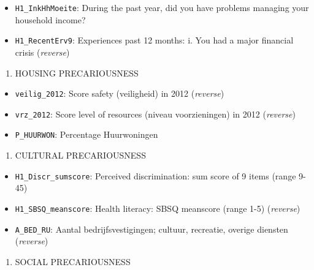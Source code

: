 \documentclass[
]{article}
\providecommand{\tightlist}{%
  \setlength{\itemsep}{0pt}\setlength{\parskip}{0pt}}\usepackage{longtable,booktabs,array}
\begin{document}
\begin{itemize}
\tightlist
\item
  \texttt{H1\_InkHhMoeite}: During the past year, did you have problems
  managing your household income?
\item
  \texttt{H1\_RecentErv9}: Experiences past 12 months: i. You had a
  major financial crisis (\emph{reverse})
\end{itemize}

\begin{enumerate}
\def\labelenumi{\arabic{enumi}.}
\setcounter{enumi}{2}
\tightlist
\item
  HOUSING PRECARIOUSNESS
\end{enumerate}

\begin{itemize}
\tightlist
\item
  \texttt{veilig\_2012}: Score safety (veiligheid) in 2012
  (\emph{reverse})
\item
  \texttt{vrz\_2012}: Score level of resources (niveau voorzieningen) in
  2012 (\emph{reverse})
\item
  \texttt{P\_HUURWON}: Percentage Huurwoningen
\end{itemize}

\begin{enumerate}
\def\labelenumi{\arabic{enumi}.}
\setcounter{enumi}{3}
\tightlist
\item
  CULTURAL PRECARIOUSNESS
\end{enumerate}

\begin{itemize}
\tightlist
\item
  \texttt{H1\_Discr\_sumscore}: Perceived discrimination: sum score of 9
  items (range 9-45)
\item
  \texttt{H1\_SBSQ\_meanscore}: Health literacy: SBSQ meanscore (range
  1-5) (\emph{reverse})
\item
  \texttt{A\_BED\_RU}: Aantal bedrijfsvestigingen; cultuur, recreatie,
  overige diensten (\emph{reverse})
\end{itemize}

\begin{enumerate}
\def\labelenumi{\arabic{enumi}.}
\setcounter{enumi}{4}
\tightlist
\item
  SOCIAL PRECARIOUSNESS
\end{enumerate}
\end{document}
